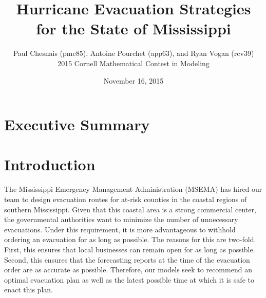 \documentclass[titlepage]{article}
\title{Hurricane Evacuation Strategies for the State of Mississippi}
\author{Paul Chesnais (pmc85), Antoine Pourchet (app63), and Ryan Vogan (rcv39)\\2015 Cornell Mathematical Contest in Modeling}
\date{November 16, 2015}
\begin{document}
\maketitle
\thispagestyle{empty}

\section{Executive Summary}
\label{sec:summary}

\section{Introduction}
\label{sec:introduction}
  The Mississippi Emergency Management Administration (MSEMA) has hired our team to design evacuation routes for at-risk counties in the coastal regions of southern Mississippi. Given that this coastal area is a strong commercial center, the governmental authorities want to minimize the number of unnecessary evacuations. Under this requirement, it is more advantageous to withhold ordering an evacuation for as long as possible. The reasons for this are two-fold. First, this ensures that local businesses can remain open for as long as possible. Second, this ensures that the forecasting reports at the time of the evacuation order are as accurate as possible. Therefore, our models seek to recommend an optimal evacuation plan as well as the latest possible time at which it is safe to enact this plan.
\end{document}
